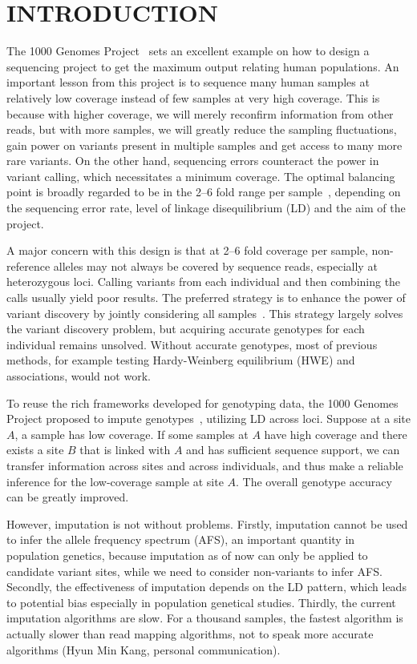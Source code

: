 \documentclass{bioinfo}
\begin{document}
\section{INTRODUCTION}

The 1000 Genomes Project~\citep{1000-Genomes-Project-Consortium:2010qc} sets an excellent example on how to design a sequencing project to
get the maximum output relating human populations. An important lesson from this project
is to sequence many human samples at relatively low coverage instead of
few samples at very high coverage. This is because with higher coverage,
we will merely reconfirm information from other reads, but with more samples, we
will greatly reduce the sampling fluctuations, gain power on variants present in
multiple samples and get access to many more rare variants. On the other hand, sequencing
errors counteract the power in variant calling, which necessitates a minimum coverage.
The optimal balancing point is broadly regarded to be in the 2--6 fold range per sample~\citep{Le:2010uq,Li:2011fk},
depending on the sequencing error rate, level of linkage disequilibrium (LD) and the
aim of the project.

A major concern with this design is that at 2--6 fold coverage per sample, non-reference alleles
may not always be covered by sequence reads, especially at heterozygous loci. Calling
variants from each individual and then combining the calls usually yield poor results.
The preferred strategy is to enhance the power of variant discovery by jointly considering
all samples~\citep{Le:2010uq,Li:2011fk,Depristo:2011vn,Nielsen:2011fk}. This strategy largely solves the variant discovery problem, but acquiring
accurate genotypes for each individual remains unsolved. Without accurate genotypes,
most of previous methods, for example testing Hardy-Weinberg equilibrium (HWE) and associations,
would not work.

To reuse the rich frameworks developed for genotyping data, the 1000 Genomes Project proposed to impute
genotypes~\citep{Li:2009gb,Browning:2009jl,Howie:2009mb,Li:2010ky}, utilizing LD across loci.
Suppose at a site $A$, a sample has low coverage.
If some samples at $A$ have high coverage and there exists a site $B$ that is linked with $A$ and has
sufficient sequence support, we can transfer information across sites and across individuals, and
thus make a reliable inference for the low-coverage sample at site $A$. The overall genotype accuracy
can be greatly improved.

However, imputation is not without problems. Firstly, imputation cannot be used to infer
the allele frequency spectrum (AFS), an important quantity in population genetics, because
imputation as of now can only be applied to candidate variant sites, while we need to consider
non-variants to infer AFS. Secondly, the effectiveness of imputation depends on the LD pattern, which
leads to potential bias especially in population genetical studies. Thirdly, the current
imputation algorithms are slow. For a thousand samples, the fastest algorithm is actually
slower than read mapping algorithms, not to speak more accurate algorithms (Hyun Min Kang, personal communication).
\end{document}
